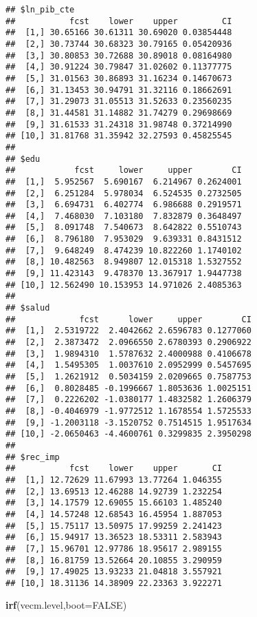 \documentclass[]{book}
\newenvironment{Shaded}{\begin{snugshade}}{\end{snugshade}}
\newcommand{\KeywordTok}[1]{\textcolor[rgb]{0.13,0.29,0.53}{\textbf{#1}}}
\newcommand{\DataTypeTok}[1]{\textcolor[rgb]{0.13,0.29,0.53}{#1}}
\newcommand{\OtherTok}[1]{\textcolor[rgb]{0.56,0.35,0.01}{#1}}
\newcommand{\NormalTok}[1]{#1}
\theoremstyle{definition}
\theoremstyle{definition}
\theoremstyle{definition}
\theoremstyle{remark}
\begin{document}
\begin{verbatim}
## $ln_pib_cte
##           fcst    lower    upper         CI
##  [1,] 30.65166 30.61311 30.69020 0.03854448
##  [2,] 30.73744 30.68323 30.79165 0.05420936
##  [3,] 30.80853 30.72688 30.89018 0.08164980
##  [4,] 30.91224 30.79847 31.02602 0.11377775
##  [5,] 31.01563 30.86893 31.16234 0.14670673
##  [6,] 31.13453 30.94791 31.32116 0.18662691
##  [7,] 31.29073 31.05513 31.52633 0.23560235
##  [8,] 31.44581 31.14882 31.74279 0.29698669
##  [9,] 31.61533 31.24318 31.98748 0.37214990
## [10,] 31.81768 31.35942 32.27593 0.45825545
## 
## $edu
##            fcst     lower     upper        CI
##  [1,]  5.952567  5.690167  6.214967 0.2624001
##  [2,]  6.251284  5.978034  6.524535 0.2732505
##  [3,]  6.694731  6.402774  6.986688 0.2919571
##  [4,]  7.468030  7.103180  7.832879 0.3648497
##  [5,]  8.091748  7.540673  8.642822 0.5510743
##  [6,]  8.796180  7.953029  9.639331 0.8431512
##  [7,]  9.648249  8.474239 10.822260 1.1740102
##  [8,] 10.482563  8.949807 12.015318 1.5327552
##  [9,] 11.423143  9.478370 13.367917 1.9447738
## [10,] 12.562490 10.153953 14.971026 2.4085363
## 
## $salud
##             fcst      lower     upper        CI
##  [1,]  2.5319722  2.4042662 2.6596783 0.1277060
##  [2,]  2.3873472  2.0966550 2.6780393 0.2906922
##  [3,]  1.9894310  1.5787632 2.4000988 0.4106678
##  [4,]  1.5495305  1.0037610 2.0952999 0.5457695
##  [5,]  1.2621912  0.5034159 2.0209665 0.7587753
##  [6,]  0.8028485 -0.1996667 1.8053636 1.0025151
##  [7,]  0.2226202 -1.0380177 1.4832582 1.2606379
##  [8,] -0.4046979 -1.9772512 1.1678554 1.5725533
##  [9,] -1.2003118 -3.1520752 0.7514515 1.9517634
## [10,] -2.0650463 -4.4600761 0.3299835 2.3950298
## 
## $rec_imp
##           fcst    lower    upper       CI
##  [1,] 12.72629 11.67993 13.77264 1.046355
##  [2,] 13.69513 12.46288 14.92739 1.232254
##  [3,] 14.17579 12.69055 15.66103 1.485240
##  [4,] 14.57248 12.68543 16.45954 1.887053
##  [5,] 15.75117 13.50975 17.99259 2.241423
##  [6,] 15.94917 13.36523 18.53311 2.583943
##  [7,] 15.96701 12.97786 18.95617 2.989155
##  [8,] 16.81759 13.52664 20.10855 3.290959
##  [9,] 17.49025 13.93233 21.04818 3.557921
## [10,] 18.31136 14.38909 22.23363 3.922271
\end{verbatim}

\begin{Shaded}
\begin{Highlighting}[]
\KeywordTok{irf}\NormalTok{(vecm.level,}\DataTypeTok{boot=}\OtherTok{FALSE}\NormalTok{)}
\end{Highlighting}
\end{Shaded}
\end{document}
